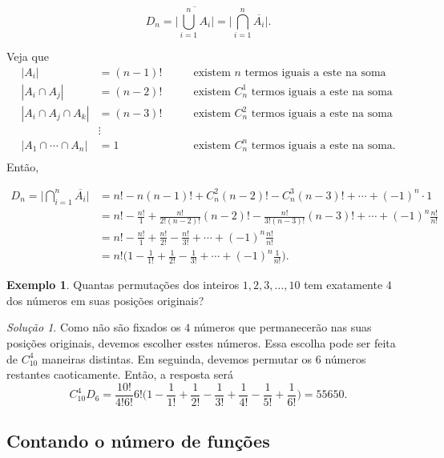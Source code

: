 \documentclass[]{book}
\theoremstyle{definition}
\theoremstyle{definition}
\newtheorem{example}{Exemplo}[chapter]
\theoremstyle{definition}
\theoremstyle{remark}
\newtheorem*{solution}{Solução}
\begin{document}
\[D_n = \Bigg|\overline{\bigcup_{i=1}^{n} A_i} \Bigg| = \Bigg|{\bigcap_{i=1}^{n} \overline{A_i}}\Bigg|.\]

Veja que
\begin{align}
|A_i| &= (n-1)! &\qquad \text{existem $n$ termos iguais a este na soma}\\
|A_i\cap A_j| &= (n-2)! &\qquad \text{existem $C_n^1$ termos iguais a este na soma}\\
|A_i\cap A_j \cap A_k| &= (n-3)! &\qquad \text{existem $C_n^2$ termos iguais a este na soma}\\
&\vdots \\
|A_1\cap\cdots\cap A_n| &= 1 &\qquad \text{existem $C_n^n$ termos iguais a este na soma}.\\
\end{align}
Então,

\begin{align}
D_n = \Bigg|{\bigcap_{i=1}^{n} \overline{A_i}}\Bigg| 
&= n! - n(n-1)! + C_n^2(n-2)! - C_n^3(n-3)! + \cdots + (-1)^n\cdot 1 \\
&= n! - \frac{n!}{1} +  \frac{n!}{2!(n-2)!}(n-2)! - \frac{n!}{3!(n-3)!}(n-3)! + \cdots + (-1)^n\frac{n!}{n!}\\
&= n! - \frac{n!}{1} +  \frac{n!}{2!} - \frac{n!}{3!} + \cdots + (-1)^n\frac{n!}{n!}\\
&= n! \Bigg(1 - \frac{1}{1!} + \frac{1}{2!} - \frac{1}{3!} + \cdots +(-1)^n\frac{1}{n!}\Bigg).
\end{align}

\begin{example}
\protect\hypertarget{exm:unnamed-chunk-104}{}{\label{exm:unnamed-chunk-104} }Quantas permutações dos inteiros \(1,2,3,\ldots,10\) tem exatamente \(4\) dos números em suas posições originais?
\end{example}

\begin{solution}
\iffalse{} {Solução. } \fi{}Como não são fixados os \(4\) números que permanecerão nas suas posições originais, devemos escolher esstes números.
Essa escolha pode ser feita de \(C_{10}^4\) maneiras distintas.
Em seguinda, devemos permutar os \(6\) números restantes caoticamente.
Então, a resposta será
\[C_{10}^4 D_6 = \frac{10!}{4!6!} 6! \Bigg(1 - \frac{1}{1!} + \frac{1}{2!} - \frac{1}{3!} + \frac{1}{4!} - \frac{1}{5!} + \frac{1}{6!}\Bigg) = 55650.\]
\end{solution}

\hypertarget{contando-o-nuxfamero-de-funuxe7uxf5es}{%
\subsection{Contando o número de funções}\label{contando-o-nuxfamero-de-funuxe7uxf5es}}
\end{document}

